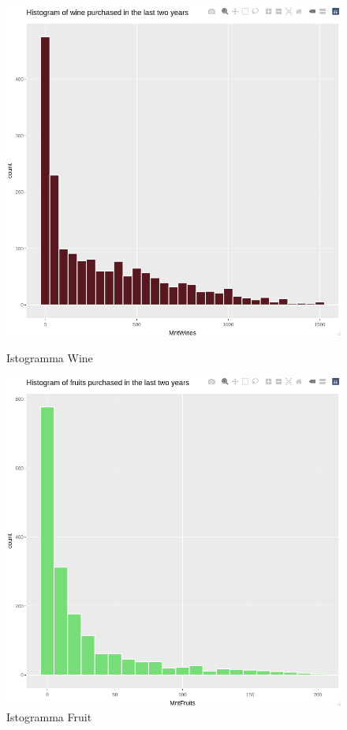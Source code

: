 \documentclass[letterpaper,11pt]{article}
\begin{document}
\begin{figure}[H]
  \centering
  \begin{minipage}[b]{0.4\textwidth}
    \includegraphics[width=\textwidth]{Img/EDA/EDA048.png}
    \caption{Istogramma Wine}
    \label{fig:IstogrammaWine}
  \end{minipage}
  \hfill
  \begin{minipage}[b]{0.4\textwidth}
    \includegraphics[width=\textwidth]{Img/EDA/EDA049.png}
    \caption{Istogramma Fruit}
     \label{fig:IstogrammaFruit}
  \end{minipage}
\end{figure}
\end{document}
